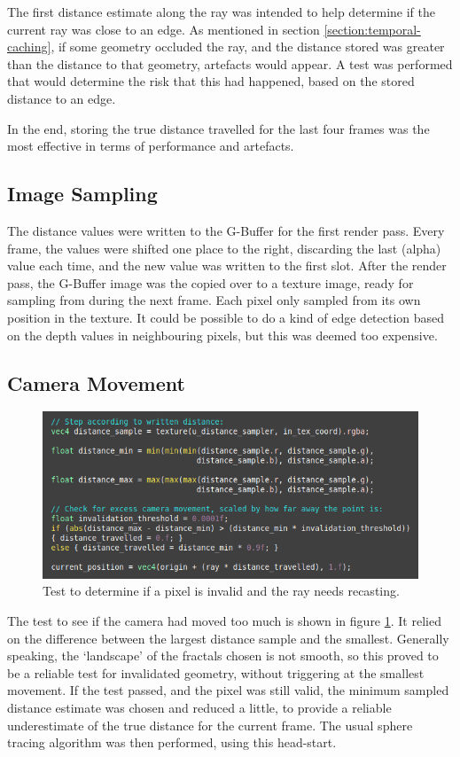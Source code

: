 The first distance estimate along the ray was intended to help determine if the current ray was close to an edge. As mentioned in section \ref{section:temporal-caching}, if some geometry occluded the ray, and the distance stored was greater than the distance to that geometry, artefacts would appear. A test was performed that would determine the risk that this had happened, based on the stored distance to an edge.\newline

In the end, storing the true distance travelled for the last four frames was the most effective in terms of performance and artefacts.

\subsection{Image Sampling}

The distance values were written to the G-Buffer for the first render pass. Every frame, the values were shifted one place to the right, discarding the last (alpha) value each time, and the new value was written to the first slot. After the render pass, the G-Buffer image was the copied over to a texture image, ready for sampling from during the next frame. Each pixel only sampled from its own position in the texture. It could be possible to do a kind of edge detection based on the depth values in neighbouring pixels, but this was deemed too expensive.

\subsection{Camera Movement}

\begin{figure}[ht]
	\centering
	\includegraphics[width=0.65\linewidth, frame]{Images/Distance-Test.png}
	\caption{Test to determine if a pixel is invalid and the ray needs recasting.}
	\label{figure:distance-test}
\end{figure}

The test to see if the camera had moved too much is shown in figure \ref{figure:distance-test}. It relied on the difference between the largest distance sample and the smallest. Generally speaking, the `landscape' of the fractals chosen is not smooth, so this proved to be a reliable test for invalidated geometry, without triggering at the smallest movement. If the test passed, and the pixel was still valid, the minimum sampled distance estimate was chosen and reduced a little, to provide a reliable underestimate of the true distance for the current frame. The usual sphere tracing algorithm was then performed, using this head-start.


